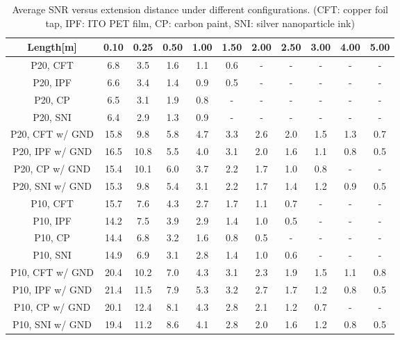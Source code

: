 \begin{table}[ht]
\caption{Average SNR versus extension distance under different configurations. (CFT: copper foil tap, IPF: ITO PET film, CP: carbon paint, SNI: silver nanoparticle ink)}
\vspace{-2mm}
\centering
	\begin{tabular}{|c|c|c|c|c|c|c|c|c|c|c|}
	
	\hline
	\textbf{Length[m]} & \textbf{0.10} & \textbf{0.25} & \textbf{0.50} & \textbf{1.00} & \textbf{1.50} & \textbf{2.00} & \textbf{2.50} & \textbf{3.00} & \textbf{4.00} & \textbf{5.00} \\
	\hline
	P20, CFT & 6.8 & 3.5 & 1.6 & 1.1 & 0.6 & - & - & - & - & - \\\hline
    P20, IPF & 6.6 & 3.4 & 1.4 & 0.9 & 0.5 & - & - & - & - & -  \\\hline
	P20, CP &  6.5 & 3.1 & 1.9 & 0.8 & - & - & - & - & - & -  \\\hline
	P20, SNI & 6.4 & 2.9 & 1.3 & 0.9 & - & - & - & - & - & -  \\\hline
	P20, CFT w/ GND &  15.8 & 9.8 & 5.8 & 4.7 & 3.3 & 2.6 & 2.0 & 1.5 & 1.3 & 0.7 \\\hline
	P20, IPF w/ GND &  16.5 & 10.8 & 5.5 & 4.0 & 3.1 & 2.0 & 1.6 & 1.1 & 0.8 & 0.5 \\\hline
	P20, CP w/ GND & 15.4 & 10.1 & 6.0 & 3.7 & 2.2 & 1.7 & 1.0 & 0.8 & - & - \\\hline
	P20, SNI w/ GND & 15.3 & 9.8 & 5.4 & 3.1 & 2.2 & 1.7 & 1.4 & 1.2 & 0.9 & 0.5  \\\hline

	P10, CFT & 15.7 & 7.6 & 4.3 & 2.7 & 1.7 & 1.1 & 0.7 & - & - & - \\\hline
	P10, IPF  & 14.2 & 7.5 & 3.9 & 2.9 & 1.4 & 1.0 & 0.5 & - & - & - \\\hline
	P10, CP &  14.4 & 6.8 & 3.2 & 1.6 & 0.8 & 0.5 & - & - & - & - \\\hline
	P10, SNI & 14.9 & 6.9 & 3.1 & 2.8 & 1.4 & 1.0 & 0.6 & - & - & -  \\\hline
	P10, CFT w/ GND & 20.4 & 10.2 & 7.0 & 4.3 & 3.1 & 2.3 & 1.9 & 1.5 & 1.1 & 0.8 \\\hline
	P10, IPF w/ GND  &  21.4 & 11.5 & 7.9 & 5.3 & 3.2 & 2.7 & 1.7 & 1.2 & 0.8 & 0.5 \\\hline
	P10, CP w/ GND & 20.1 & 12.4 & 8.1 & 4.3 & 2.8 & 2.1 & 1.2 & 0.7 & - & - \\\hline
	P10, SNI w/ GND &  19.4 & 11.2 & 8.6 & 4.1 & 2.8 & 2.0 & 1.6 & 1.2 & 0.8 & 0.5 \\\hline
	\end{tabular}
	
	\label{tab:snrtable}
	
\end{table}

